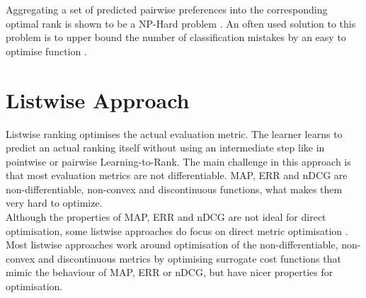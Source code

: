 Aggregating a set of predicted pairwise preferences into the corresponding optimal rank is shown to be a NP-Hard problem \cite{Feldman2012}. An often used solution to this problem is to upper bound the number of classification mistakes by an easy to optimise function \cite{Bartlett2006}.
\section{Listwise Approach}
Listwise ranking optimises the actual evaluation metric. The learner learns to predict an actual ranking itself without using an intermediate step like in pointwise or pairwise Learning-to-Rank. The main challenge in this approach is that most evaluation metrics are not differentiable. \ac{MAP}, \ac{ERR} and \ac{nDCG} are non-differentiable, non-convex and discontinuous functions, what makes them very hard to optimize.\\

Although the properties of \ac{MAP}, \ac{ERR} and \ac{nDCG} are not ideal for direct optimisation, some listwise approaches do focus on direct metric optimisation \cite{Yue2007, Taylor2008, Chapelle2010}. Most listwise approaches work around optimisation of the non-differentiable, non-convex and discontinuous metrics by optimising surrogate cost functions that mimic the behaviour of \ac{MAP}, \ac{ERR} or \ac{nDCG}, but have nicer properties for optimisation. 